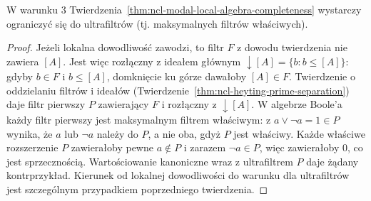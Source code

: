 \begin{wniosek}
\label{cor:ncl-modal-local-ultrafilters}
W warunku 3
Twierdzenia~\ref{thm:ncl-modal-local-algebra-completeness}
wystarczy ograniczyć się do ultrafiltrów
(tj. maksymalnych filtrów właściwych).
\end{wniosek}
\begin{proof}
Jeżeli lokalna dowodliwość zawodzi, to filtr
$F$ z dowodu twierdzenia nie zawiera $[A]$.
Jest więc rozłączny z ideałem głównym
$\downarrow[A]=\{b:b\leq[A]\}$: gdyby
$b\in F$ i $b\leq[A]$, domknięcie ku górze
dawałoby $[A]\in F$.
Twierdzenie o oddzielaniu filtrów i ideałów
(Twierdzenie~\ref{thm:ncl-heyting-prime-separation})
daje filtr pierwszy $P$ zawierający $F$
i rozłączny z $\downarrow[A]$.
W algebrze Boole'a każdy filtr pierwszy
jest maksymalnym filtrem właściwym:
z $a\vee\neg a=1\in P$ wynika, że $a$
lub $\neg a$ należy do $P$, a nie oba,
gdyż $P$ jest właściwy.
Każde właściwe rozszerzenie $P$ zawierałoby
pewne $a\notin P$ i zarazem $\neg a\in P$,
więc zawierałoby $0$, co jest sprzecznością.
Wartościowanie kanoniczne wraz z ultrafiltrem
$P$ daje żądany kontrprzykład.
Kierunek od lokalnej dowodliwości do warunku
dla ultrafiltrów jest szczególnym przypadkiem
poprzedniego twierdzenia.
\end{proof}

